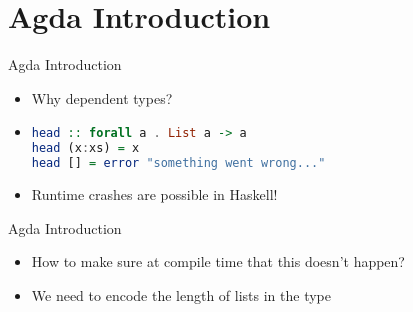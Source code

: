 \section{Agda Introduction}
\begin{frame}[fragile]{Agda Introduction}
\begin{itemize}
\item Why dependent types?
\pause \item
\begin{lstlisting}[language=Haskell]
head :: forall a . List a -> a
head (x:xs) = x
head [] = error "something went wrong..."
\end{lstlisting}
\pause \item Runtime crashes are possible in Haskell!
\end{itemize}
\end{frame}

\begin{frame}[fragile]{Agda Introduction}
\begin{itemize}
\item How to make sure at compile time that this doesn't happen?
\item We need to encode the length of lists in the type
\end{itemize}
\pause
\begin{code}%
\>  \AgdaSymbol{:}  \<%
\\
\>[0]\<[2]%
\>[2] \AgdaSymbol{:} \<%
\\
\>[0]\<[2]%
\>[2] \AgdaSymbol{:}   \<%
\end{code}
\pause
\vspace{0.5cm}
\begin{code}%
\>  \AgdaSymbol{:} \AgdaSymbol{(} \AgdaSymbol{:} \AgdaSymbol{)}  \AgdaSymbol{(} \AgdaSymbol{:} \AgdaSymbol{)}   \<%
\\
\>[0]\<[2]%
\>[2] \<[7]%
\>[7]\AgdaSymbol{:}  \AgdaSymbol{\{}\AgdaSymbol{\}}    \<%
\\
\>[0]\<[2]%
\>[2] \AgdaSymbol{:}  \AgdaSymbol{\{} \AgdaSymbol{\}}          \AgdaSymbol{(} \AgdaSymbol{)}\<%
\end{code}
\end{frame}

